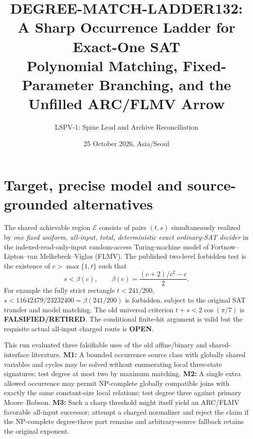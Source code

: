 \documentclass[11pt]{article}
\title{DEGREE-MATCH-LADDER132: A Sharp Occurrence Ladder for Exact-One SAT\\
\large Polynomial Matching, Fixed-Parameter Branching, and the Unfilled ARC/FLMV Arrow}
\author{LSPV-1: Spine Lead and Archive Reconciliation}
\date{25 October 2026, Asia/Seoul}
\begin{document}
\maketitle

\begin{center}\end{center}

\section{Target, precise model and source-grounded alternatives}
The shared achievable region \(\mathcal E\) consists of pairs \((t,s)\) simultaneously realized by \emph{one fixed uniform, all-input, total, deterministic exact ordinary-SAT decider} in the indexed-read-only-input random-access Turing-machine model of Fortnow--Lipton--van Melkebeek--Viglas (FLMV). The published two-level forbidden test is the existence of \(c>\max\{1,t\}\) such that
\[
 s<\beta(c),\qquad \beta(c)=\frac{(c+2)/c^2-c}{2}.
\]
For example the fully strict rectangle \(t<241/200\), \(s<11642479/23232400=\beta(241/200)\) is forbidden, subject to the original SAT transfer and model matching. The old universal criterion \(t+s<2\cos(\pi/7)\) is \textbf{FALSIFIED/RETIRED}. The conditional finite-hit argument is valid but the requisite actual all-input charged route is \textbf{OPEN}.

This run evaluated three falsifiable uses of the old affine/binary and shared-interface literature. \textbf{M1:} A bounded occurrence source class with globally shared variables and cycles may be solved without enumerating local three-state signatures; test degree at most two by maximum matching. \textbf{M2:} A single extra allowed occurrence may permit NP-complete globally compatible joins with exactly the same constant-size local relations; test degree three against primary Moore--Robson. \textbf{M3:} Such a sharp threshold might itself yield an ARC/FLMV favorable all-input successor; attempt a charged normalizer and reject the claim if the NP-complete degree-three part remains and arbitrary-source fallback retains the original exponent.
\end{document}
